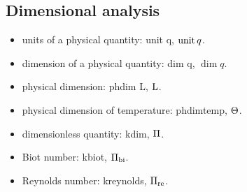 \subsection{Dimensional analysis}
\begin{itemize}
\item units of a physical quantity: unit q, $\operatorname{unit} q$.
\item dimension of a physical quantity: dim q, $\dim q$.
\item physical dimension: phdim L, $\text{L}$.
\item physical dimension of temperature: phdimtemp, $\Theta$.
\item dimensionless quantity: kdim, $\Pi$.
\item Biot number: kbiot, $\Pi_\text{bi}$.
\item Reynolds number: kreynolds, $\Pi_\text{re}$.
\end{itemize}
